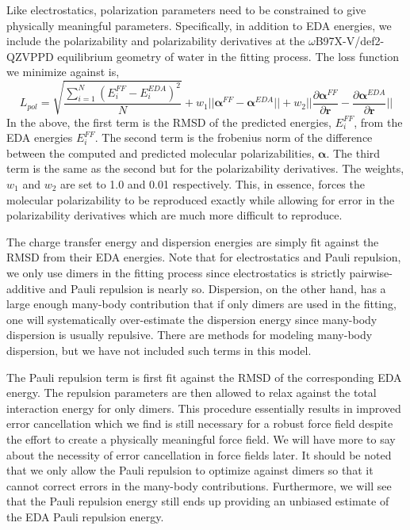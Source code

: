 \documentclass[journal=jacsat,manuscript=article]{achemso}
\begin{document}
Like electrostatics, polarization parameters need to be constrained to give physically meaningful
parameters. Specifically, in addition to EDA energies, we include the polarizability and polarizability derivatives
at the $\omega$B97X-V/def2-QZVPPD equilibrium geometry of water in the fitting process.
The loss function we minimize against is,
\begin{equation}
  L_{pol}=\sqrt{\frac{\sum_{i=1}^{N}(E_i^{FF}-E_i^{EDA})^2}{N}} + w_1||\bm{\alpha}^{FF}-\bm{\alpha}^{EDA}||+w_2||\frac{\partial\bm{\alpha}^{FF}}{\partial \bm{r}}-\frac{\partial\bm{\alpha}^{EDA}}{\partial \bm{r}}||
\label{eq:pol_loss}
\end{equation}
\noindent
In the above, the first term is the RMSD of the predicted energies, $E_i^{FF}$, from the
EDA energies $E_i^{FF}$. The second term is the frobenius norm of the difference between the
computed and predicted molecular polarizabilities, $\bm{\alpha}$. The third term is the same as
the second but for the polarizability derivatives. The weights, $w_1$ and $w_2$ are set to
1.0 and 0.01 respectively. This, in essence, forces the molecular polarizability to be
reproduced exactly while allowing for error in the polarizability derivatives which are much
more difficult to reproduce.

The charge transfer energy and dispersion energies are simply fit against the RMSD
from their EDA energies. Note that for electrostatics and Pauli repulsion, we only use dimers in
the fitting process since electrostatics is strictly pairwise-additive and Pauli repulsion is nearly so.
Dispersion, on the other hand, has a large enough many-body contribution that if only dimers
are used in the fitting, one will systematically over-estimate the dispersion energy since
many-body dispersion is usually repulsive. There are methods for modeling many-body dispersion,
but we have not included such terms in this model.\cite{anatole2010two,van2018new}

The Pauli repulsion term is first fit against the RMSD of the corresponding EDA energy.
The repulsion parameters are then allowed to relax against the total interaction energy
for only dimers. This procedure essentially results in improved error cancellation
which we find is still necessary for a robust force field despite the effort
to create a physically meaningful force field. We will have more to say about the necessity
of error cancellation in force fields later. It should be noted that we only allow
the Pauli repulsion to optimize against dimers so that it cannot correct errors
in the many-body contributions. Furthermore, we will see that the Pauli repulsion energy
still ends up providing an unbiased estimate of the EDA Pauli repulsion energy.
\end{document}
